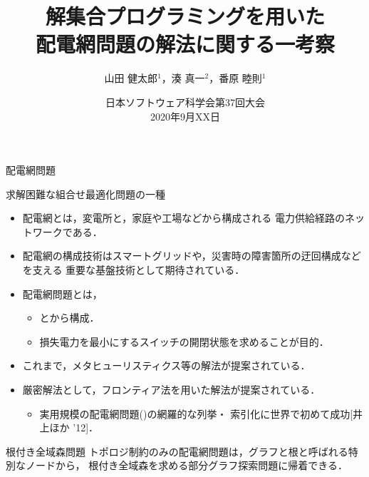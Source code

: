 \documentclass[dvipdfmx,11pt]{beamer}
\title{解集合プログラミングを用いた\\配電網問題の解法に関する一考察}
\author[山田 健太郎，湊 真一，番原 睦則]{山田 健太郎$^1$，湊 真一$^2$，番原 睦則$^1$}
\date{日本ソフトウェア科学会第37回大会\\2020年9月XX日}
\institute{1.名古屋大学 大学院情報学研究科 \\ 2.京都大学 大学院情報学研究科}
\begin{document}
\begin{frame}{}
  \titlepage
\end{frame}

\begin{frame}{配電網問題}
 \begin{alertblock}{}
  \centering
  求解困難な組合せ最適化問題の一種
 \end{alertblock}

 \begin{itemize}
  \item  \alert{配電網}とは，変電所と，家庭や工場などから構成される
		 電力供給経路のネットワークである．
  \item  配電網の構成技術はスマートグリッドや，災害時の障害箇所の迂回構成などを支える
		 重要な基盤技術として期待されている．
  \item  \alert{配電網問題}とは，
		 \begin{itemize}
		  \item {}とから構成．
		  \item 損失電力を最小にするスイッチの開閉状態を求めることが目的．
		 \end{itemize}
  \item これまで，メタヒューリスティクス等の解法が提案されている．
  \item 厳密解法として，フロンティア法を用いた解法が提案されている．
		\begin{itemize}
		 \item 実用規模の配電網問題()の網羅的な列挙・
			   索引化に世界で初めて成功[井上ほか '12]．
		\end{itemize}
 \end{itemize}

 \vspace{-0.25cm}
 \pause
 \begin{alertblock}{根付き全域森問題}
  トポロジ制約のみの配電網問題は，グラフと根と呼ばれる特別なノードから，
  \alert{根付き全域森}を求める部分グラフ探索問題に帰着できる．
 \end{alertblock}
  
\end{frame}
\end{document}
